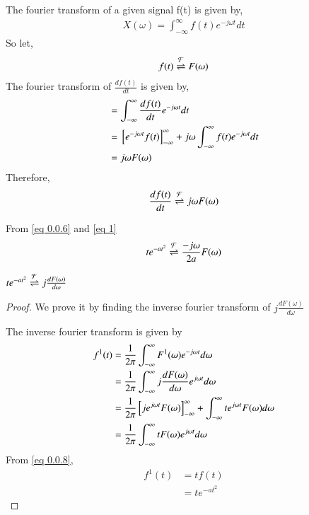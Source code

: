 \documentclass[journal,12pt,twocolumn]{IEEEtran}
\begin{document}
        The fourier transform of a given signal f(t) is given by,
        \begin{align}
            X(\omega) = \int_{-\infty}^{\infty} f(t) e^{-j\omega t} dt
        \end{align}
       So let,
        \begin{align}
            f(t) \overset{\mathcal{F}}{ \rightleftharpoons} F(\omega)
        \end{align}
        The fourier transform of $\frac{d f(t)}{dt}$ is given by,
        \begin{align}
            &= \int_{-\infty}^{\infty}  \frac{df(t)}{dt} e^{-j\omega t} dt\\
            &= {}\left[e^{-j\omega t} f(t)\right]_{-\infty}^{\infty} + j\omega \int_{-\infty}^{\infty} f(t) e^{-j\omega t} dt\\
            &= j\omega F(\omega)
        \end{align}
        Therefore,
        \begin{align}
            \frac{df(t)}{dt} \overset{\mathcal{F}}{ \rightleftharpoons} j\omega F(\omega) \label {eq 0.0.6}
        \end{align}
        
        From \eqref{eq 0.0.6} and \eqref{eq 1}
        \begin{align}
            te^{-at^2} \overset{\mathcal{F}}{ \rightleftharpoons} \frac{-j\omega}{2a} F(\omega) \label{eq 0.0.7}
        \end{align}
        
        \begin{lemma}
        $te^{-at^2} \overset{\mathcal{F}}{ \rightleftharpoons} j\frac{dF(\omega)}{d\omega}$ 
        \label{lemma 1}
        \end{lemma}
        \begin{proof}
        We prove it by finding the inverse fourier transform of $j\frac{dF(\omega)}{d\omega}$
        
        The inverse fourier transform is given by
        \begin{align}
            f^1(t) &= \frac{1}{2\pi} \int_{-\infty}^{\infty} F^1(\omega)e^{-j\omega t} d\omega\\\label{eq 0.0.8}
            &= \frac{1}{2\pi} \int_{-\infty}^{\infty} j\frac{dF(\omega)}{d\omega}
            e^{j\omega t} d\omega\\
            &= \frac{1}{2\pi} {}\left[je^{j\omega t} F(\omega)\right]_{-\infty}^{\infty} + \int_{-\infty}^{\infty} te^{j\omega t} F(\omega) d\omega \\
            &= \frac{1}{2\pi} \int_{-\infty}^{\infty} t F(\omega) e^{j\omega t} d\omega 
        \end{align}
        From \eqref{eq 0.0.8}, 
        \begin{align}
            f^1(t) &= tf(t)\\
            &= te^{-at^2} 
        \end{align}
        \end{proof}
        
\end{document}
